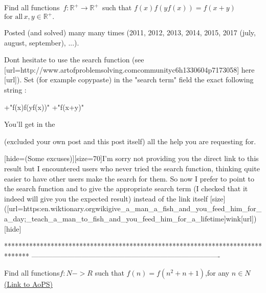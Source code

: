 \begin{solution}
	\begin{tcolorbox}Find all functions $ \,f: {\mathbb{R^+}}\rightarrow{\mathbb{R^+}}\,$ such that
$f(x)f(yf(x))=f(x+y)$ $ \text{for all}\,x,y\in\mathbb{R^+}.$\end{tcolorbox}
Posted (and solved) many many times (2011, 2012, 2013, 2014, 2015, 2017 (july, august, september), ...).

Dont hesitate to use the search function (see [url=http://www.artofproblemsolving.com\/community\/c6h1330604p7173058] here [\/url]).
Set (for example copy\/paste) in the "search term" field the exact following string : 

+"f(x)f(yf(x))" +"f(x+y)"

You'll get in the  (excluded your own post and this post itself) all the help you are requesting for.

[hide=(Some excuses)][size=70]I'm sorry not providing you the direct link to this result but I encountered users who never tried the search function, thinking quite easier to have other users make the search for them. So now I prefer to point to the search function and to give the appropriate search term (I checked that it indeed will give you the expected result) instead of the link itself [\/size]([url=https:\/\/en.wiktionary.org\/wiki\/give_a_man_a_fish_and_you_feed_him_for_a_day;_teach_a_man_to_fish_and_you_feed_him_for_a_lifetime]wink[\/url])[\/hide]


\end{solution}
*******************************************************************************
-------------------------------------------------------------------------------

\begin{problem}
	Find all functions$ f:N->R$ such that $f(n) =f(n^2 +n+1)$,for any $ n \in N$
	\flushright \href{https://artofproblemsolving.com/community/c6h1571179}{(Link to AoPS)}
\end{problem}



